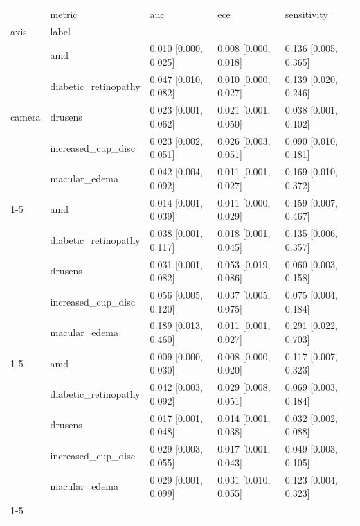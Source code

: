 \begin{tabular}{lllll}
\toprule
 & metric & auc & ece & sensitivity \\
axis & label &  &  &  \\
\midrule
\multirow[t]{5}{*}{camera} & amd & 0.010 [0.000, 0.025] & 0.008 [0.000, 0.018] & 0.136 [0.005, 0.365] \\
 & diabetic_retinopathy & 0.047 [0.010, 0.082] & 0.010 [0.000, 0.027] & 0.139 [0.020, 0.246] \\
 & drusens & 0.023 [0.001, 0.062] & 0.021 [0.001, 0.050] & 0.038 [0.001, 0.102] \\
 & increased_cup_disc & 0.023 [0.002, 0.051] & 0.026 [0.003, 0.051] & 0.090 [0.010, 0.181] \\
 & macular_edema & 0.042 [0.004, 0.092] & 0.011 [0.001, 0.027] & 0.169 [0.010, 0.372] \\
\cline{1-5}
\multirow[t]{5}{*}{quality} & amd & 0.014 [0.001, 0.039] & 0.011 [0.000, 0.029] & 0.159 [0.007, 0.467] \\
 & diabetic_retinopathy & 0.038 [0.001, 0.117] & 0.018 [0.001, 0.045] & 0.135 [0.006, 0.357] \\
 & drusens & 0.031 [0.001, 0.082] & 0.053 [0.019, 0.086] & 0.060 [0.003, 0.158] \\
 & increased_cup_disc & 0.056 [0.005, 0.120] & 0.037 [0.005, 0.075] & 0.075 [0.004, 0.184] \\
 & macular_edema & 0.189 [0.013, 0.460] & 0.011 [0.001, 0.027] & 0.291 [0.022, 0.703] \\
\cline{1-5}
\multirow[t]{5}{*}{sex} & amd & 0.009 [0.000, 0.030] & 0.008 [0.000, 0.020] & 0.117 [0.007, 0.323] \\
 & diabetic_retinopathy & 0.042 [0.003, 0.092] & 0.029 [0.008, 0.051] & 0.069 [0.003, 0.184] \\
 & drusens & 0.017 [0.001, 0.048] & 0.014 [0.001, 0.038] & 0.032 [0.002, 0.088] \\
 & increased_cup_disc & 0.029 [0.003, 0.055] & 0.017 [0.001, 0.043] & 0.049 [0.003, 0.105] \\
 & macular_edema & 0.029 [0.001, 0.099] & 0.031 [0.010, 0.055] & 0.123 [0.004, 0.323] \\
\cline{1-5}
\bottomrule
\end{tabular}
